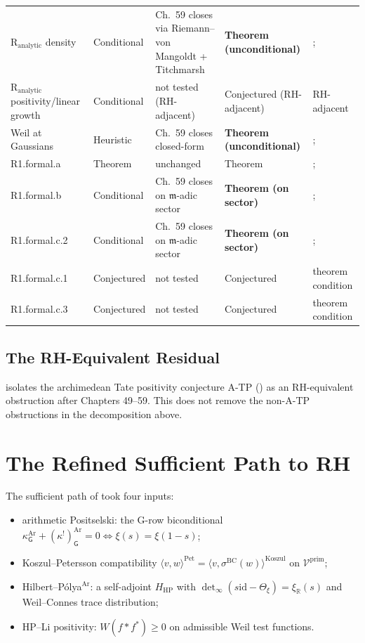 \begin{longtable}{p{}|p{}|p{}|p{}|p{}}
\(\mathrm{R}_{\mathrm{analytic}}\) density & Conditional &
Ch.~59 closes via Riemann--von Mangoldt + Titchmarsh &
\textbf{Theorem (unconditional)} &; \\
\(\mathrm{R}_{\mathrm{analytic}}\) positivity/linear growth &
Conditional & not tested (RH-adjacent) & Conjectured
(RH-adjacent) & RH-adjacent \\
Weil at Gaussians & Heuristic & Ch.~59 closes closed-form &
\textbf{Theorem (unconditional)} &; \\
R1.formal.a & Theorem & unchanged & Theorem &; \\
R1.formal.b & Conditional & Ch.~59 closes on
\(\mathfrak{m}\)-adic sector & \textbf{Theorem (on sector)} &; \\
R1.formal.c.2 & Conditional & Ch.~59 closes on
\(\mathfrak{m}\)-adic sector & \textbf{Theorem (on sector)} &; \\
R1.formal.c.1 & Conjectured & not tested & Conjectured & theorem condition \\
R1.formal.c.3 & Conjectured & not tested & Conjectured & theorem condition \\
\end{longtable}
\endgroup

\subsection{The RH-Equivalent Residual}
\label{v4-arith:w5-synth:crown-jewel}

 isolates the archimedean Tate
positivity conjecture A-TP
() as an
RH-equivalent obstruction after Chapters 49--59. This does not remove
the non-A-TP obstructions in the decomposition above.

\section{The Refined Sufficient Path to RH}
\label{v4-arith:w5-synth:refined-sufficient-path}

The sufficient path of  took four
inputs:
\begin{itemize}
\item[(P1)] arithmetic Positselski: the G-row biconditional
\(\kappa^{\mathrm{Ar}}_{\mathsf{G}}+(\kappa^{!})^{\mathrm{Ar}}_{\mathsf{G}}=0
\Leftrightarrow \xi(s)=\xi(1-s)\);
\item[(KP)] Koszul--Petersson compatibility
\(\langle v,w\rangle^{\mathrm{Pet}}=\langle v,\sigma^{\mathrm{BC}}(w)\rangle^{\mathrm{Koszul}}\)
on \(\mathcal{V}^{\mathrm{prim}}\);
\item[(HP)] Hilbert--P\'olya\(^{\mathrm{Ar}}\): a self-adjoint
\(H_{\mathrm{HP}}\) with
\(\det_{\infty}(s\mathrm{id}-\Theta_{\xi})=\xi_{\mathbb{R}}(s)\)
and Weil--Connes trace distribution;
\item[(HPLi)] HP--Li positivity:
\(W(f*f^*)\geq 0\) on admissible Weil test functions.
\end{itemize}

